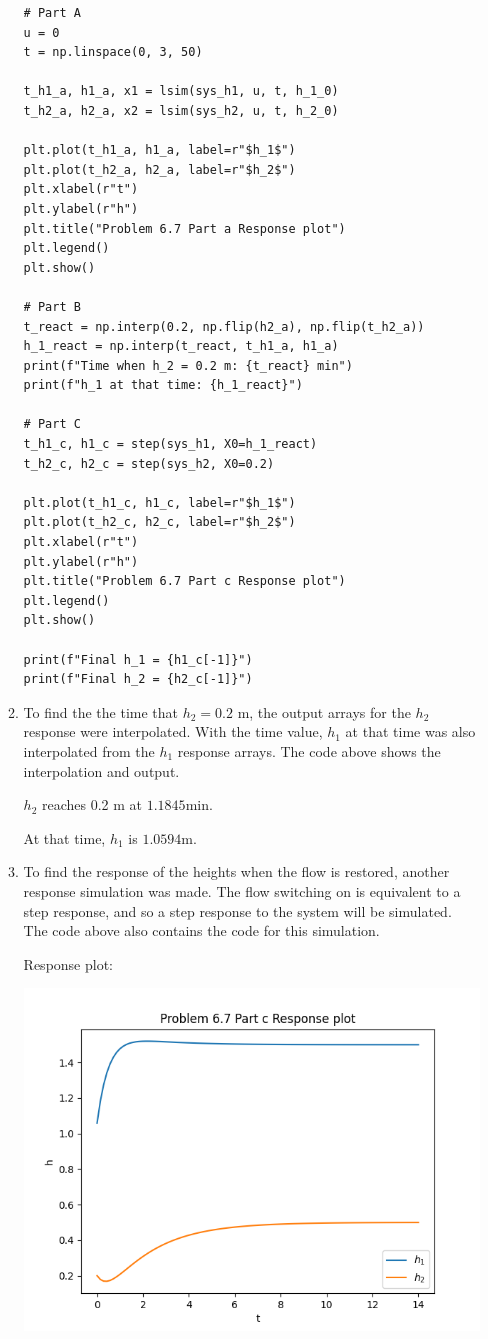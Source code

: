 \documentclass[12pt]{article}
\begin{document}
\begin{enumerate}
\begin{enumerate}
\begin{verbatim}
# Part A
u = 0
t = np.linspace(0, 3, 50)

t_h1_a, h1_a, x1 = lsim(sys_h1, u, t, h_1_0)
t_h2_a, h2_a, x2 = lsim(sys_h2, u, t, h_2_0)

plt.plot(t_h1_a, h1_a, label=r"$h_1$")
plt.plot(t_h2_a, h2_a, label=r"$h_2$")
plt.xlabel(r"t")
plt.ylabel(r"h")
plt.title("Problem 6.7 Part a Response plot")
plt.legend()
plt.show()

# Part B
t_react = np.interp(0.2, np.flip(h2_a), np.flip(t_h2_a))
h_1_react = np.interp(t_react, t_h1_a, h1_a)
print(f"Time when h_2 = 0.2 m: {t_react} min")
print(f"h_1 at that time: {h_1_react}")

# Part C
t_h1_c, h1_c = step(sys_h1, X0=h_1_react)
t_h2_c, h2_c = step(sys_h2, X0=0.2)

plt.plot(t_h1_c, h1_c, label=r"$h_1$")
plt.plot(t_h2_c, h2_c, label=r"$h_2$")
plt.xlabel(r"t")
plt.ylabel(r"h")
plt.title("Problem 6.7 Part c Response plot")
plt.legend()
plt.show()

print(f"Final h_1 = {h1_c[-1]}")
print(f"Final h_2 = {h2_c[-1]}")
\end{verbatim}

\item To find the the time that $h_2 = 0.2$ m, the output arrays for the $h_2$ response were interpolated. With the time value, $h_1$ at that time was also interpolated from the $h_1$ response arrays. The code above shows the interpolation and output.

$h_2$ reaches 0.2 m at $\boxed{1.1845 \text{min}}$.

At that time, $h_1$ is $\boxed{1.0594 \text{m}}$.

\item To find the response of the heights when the flow is restored, another response simulation was made. The flow switching on is equivalent to a step response, and so a step response to the system will be simulated. The code above also contains the code for this simulation. 

Response plot:

\includegraphics{assets/p2_c.png}


\end{enumerate}
\end{enumerate}
\end{document}
